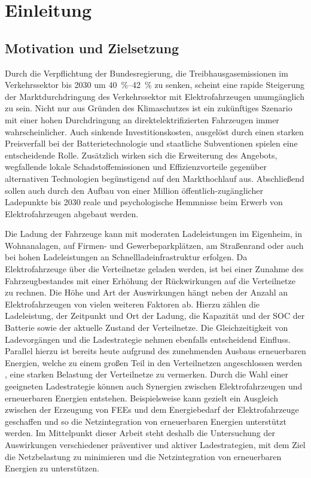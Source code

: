 \section{Einleitung}


\subsection{Motivation und Zielsetzung}

Durch die Verpflichtung der Bundesregierung, die Treibhausgasemissionen im Verkehrssektor bis \num{2030} um \SIrange[range-phrase=~bis~]{40}{42}{\percent} \cite{BundesministeriumUmwelt2019} zu senken, scheint eine rapide Steigerung der Marktdurchdringung des Verkehrssektor mit Elektrofahrzeugen unumgänglich zu sein.
Nicht nur aus Gründen des Klimaschutzes ist ein zukünftiges Szenario mit einer hohen Durchdringung an direktelektrifizierten Fahrzeugen immer wahrscheinlicher.
Auch sinkende Investitionskosten, ausgelöst durch einen starken Preisverfall bei der Batterietechnologie und staatliche Subventionen spielen eine entscheidende Rolle.
Zusätzlich wirken sich die Erweiterung des Angebots, wegfallende lokale Schadstoffemissionen und Effizienzvorteile gegenüber alternativen Technologien begünstigend auf den Markthochlauf aus.
Abschließend sollen auch durch den Aufbau von einer Million öffentlich-zugänglicher Ladepunkte bis \num{2030} \cite{DieBundesregierung2019} reale und psychologische Hemmnisse beim Erwerb von Elektrofahrzeugen abgebaut werden.\medskip

Die Ladung der Fahrzeuge kann mit moderaten Ladeleistungen im Eigenheim, in Wohnanalagen, auf Firmen- und Gewerbeparkplätzen, am Straßenrand oder auch bei hohen Ladeleistungen an Schnellladeinfrastruktur erfolgen.
Da Elektrofahrzeuge über die Verteilnetze geladen werden, ist bei einer Zunahme des Fahrzeugbestandes mit einer Erhöhung der Rückwirkungen auf die Verteilnetze zu rechnen.
Die Höhe und Art der Auswirkungen hängt neben der Anzahl an Elektrofahrzeugen von vielen weiteren Faktoren ab.
Hierzu zählen die Ladeleistung, der Zeitpunkt und Ort der Ladung, die Kapazität und der \gls{SOC} der Batterie sowie der aktuelle Zustand der Verteilnetze.
Die Gleichzeitigkeit von Ladevorgängen und die Ladestrategie nehmen ebenfalls entscheidend Einfluss.
Parallel hierzu ist bereits heute aufgrund des zunehmenden Ausbaus erneuerbaren Energien, welche zu einem großen Teil in den Verteilnetzen angeschlossen werden \cite{AgoraEnergiewende2017}, eine starken Belastung der Verteilnetze zu vermerken.
Durch die Wahl einer geeigneten Ladestrategie können auch Synergien zwischen Elektrofahrzeugen und erneuerbaren Energien entstehen.
Beispielsweise kann gezielt ein Ausgleich zwischen der Erzeugung von \glspl{FEE} und dem Energiebedarf der Elektrofahrzeuge geschaffen und so die Netzintegration von erneuerbaren Energien unterstützt werden.
Im Mittelpunkt dieser Arbeit steht deshalb die Untersuchung der Auswirkungen verschiedener präventiver und aktiver Ladestrategien, mit dem Ziel die Netzbelastung zu minimieren und die Netzintegration von erneuerbaren Energien zu unterstützen.\medskip

